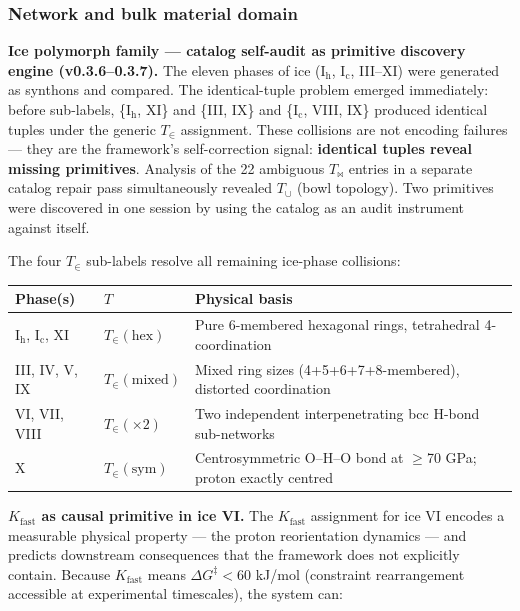 \documentclass[12pt,a4paper]{article}
\begin{document}
\subsubsection{Network and bulk material domain}

\textbf{Ice polymorph family --- catalog self-audit as primitive discovery engine (v0.3.6--0.3.7).} The eleven phases of ice (I$_\text{h}$, I$_\text{c}$, III--XI) were generated as synthons and compared. The identical-tuple problem emerged immediately: before sub-labels, \{I$_\text{h}$, XI\} and \{III, IX\} and \{I$_\text{c}$, VIII, IX\} produced identical tuples under the generic $T_{\in}$ assignment. These collisions are not encoding failures --- they are the framework's self-correction signal: \textbf{identical tuples reveal missing primitives}. Analysis of the 22 ambiguous $T_{\bowtie}$ entries in a separate catalog repair pass simultaneously revealed $T_{\cup}$ (bowl topology). Two primitives were discovered in one session by using the catalog as an audit instrument against itself.

The four $T_{\in}$ sub-labels resolve all remaining ice-phase collisions:

\begin{table}[htbp]
\centering
\small
{}
\begin{tabularx}{\textwidth}{>{\centering\arraybackslash}X >{\centering\arraybackslash}X >{\centering\arraybackslash}X}
\toprule
\rowcolor{gray!25}\textbf{Phase(s)} & \textbf{$T$} & \textbf{Physical basis} \\
\midrule
\rowcolors{1}{white}{gray!10}
I$_\text{h}$, I$_\text{c}$, XI & $T_{\in}(\text{hex})$ & Pure 6-membered hexagonal rings, tetrahedral 4-coordination \\
III, IV, V, IX & $T_{\in}(\text{mixed})$ & Mixed ring sizes (4+5+6+7+8-membered), distorted coordination \\
VI, VII, VIII & $T_{\in}(\times 2)$ & Two independent interpenetrating bcc H-bond sub-networks \\
X & $T_{\in}(\text{sym})$ & Centrosymmetric O--H--O bond at $\geq$70 GPa; proton exactly centred \\
\bottomrule
\end{tabularx}
\end{table}

\textbf{$K_{\text{fast}}$ as causal primitive in ice VI.} The $K_{\text{fast}}$ assignment for ice VI encodes a measurable physical property --- the proton reorientation dynamics --- and predicts downstream consequences that the framework does not explicitly contain. Because $K_{\text{fast}}$ means $\Delta G^\ddagger < 60$ kJ/mol (constraint rearrangement accessible at experimental timescales), the system can:
\end{document}
